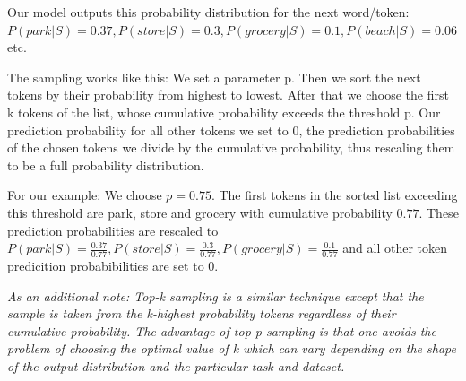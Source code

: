 \documentclass[a4paper,12pt]{extarticle}
\begin{document}
Our model outputs this probability distribution for the next word/token:
$P(park|S) = 0.37, P(store|S) = 0.3, P(grocery|S) = 0.1, P(beach|S) = 0.06$ etc. \newline

The sampling works like this: We set a parameter p. Then we sort the next tokens by their probability from highest to lowest. After that we choose the first k tokens of the list, whose cumulative probability exceeds the threshold p. Our prediction probability for all other tokens we set to 0, the prediction probabilities of the chosen tokens we divide by the cumulative probability, thus rescaling them to be a full probability distribution.\newline

For our example: We choose $p = 0.75$. The first tokens in the sorted list exceeding this threshold are park, store and grocery with cumulative probability $0.77$. These prediction probabilities are rescaled to $P(park|S) = \frac{0.37}{0.77}, P(store|S) = \frac{0.3}{0.77}, P(grocery|S) = \frac{0.1}{0.77}$ and all other token predicition probabibilities are set to 0.\newline

\textit{As an additional note: Top-k sampling is a similar technique except that the sample is taken from the k-highest probability tokens regardless of their cumulative probability. The advantage of top-p sampling is that one avoids the problem of choosing the optimal value of k which can vary depending on the shape of the output distribution and the particular task and dataset.} 
\end{document}
